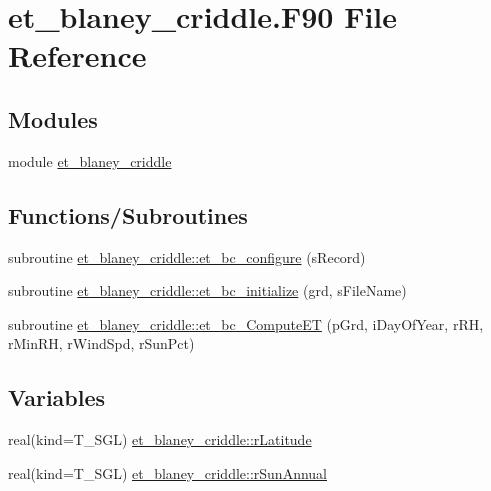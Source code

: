 \hypertarget{et__blaney__criddle_8_f90}{
\section{et\_\-blaney\_\-criddle.F90 File Reference}
\label{et__blaney__criddle_8_f90}
}
\subsection*{Modules}
\begin{DoxyCompactItemize}
\item 
module \hyperlink{namespaceet__blaney__criddle}{et\_\-blaney\_\-criddle}
\end{DoxyCompactItemize}
\subsection*{Functions/Subroutines}
\begin{DoxyCompactItemize}
\item 
subroutine \hyperlink{namespaceet__blaney__criddle_a01ab00967e31dd22412693ce759baa17}{et\_\-blaney\_\-criddle::et\_\-bc\_\-configure} (sRecord)
\item 
subroutine \hyperlink{namespaceet__blaney__criddle_a44173fa4425711dfbec3af466c0bf584}{et\_\-blaney\_\-criddle::et\_\-bc\_\-initialize} (grd, sFileName)
\item 
subroutine \hyperlink{namespaceet__blaney__criddle_ae849a22107d6dfbdc4cf37bd66a15c25}{et\_\-blaney\_\-criddle::et\_\-bc\_\-ComputeET} (pGrd, iDayOfYear, rRH, rMinRH, rWindSpd, rSunPct)
\end{DoxyCompactItemize}
\subsection*{Variables}
\begin{DoxyCompactItemize}
\item 
real(kind=T\_\-SGL) \hyperlink{namespaceet__blaney__criddle_abf5bb3e13dbddedbfd78a519afe53b73}{et\_\-blaney\_\-criddle::rLatitude}
\item 
real(kind=T\_\-SGL) \hyperlink{namespaceet__blaney__criddle_a6cb99bb829eb26317eecf0d938c1f69a}{et\_\-blaney\_\-criddle::rSunAnnual}
\end{DoxyCompactItemize}
